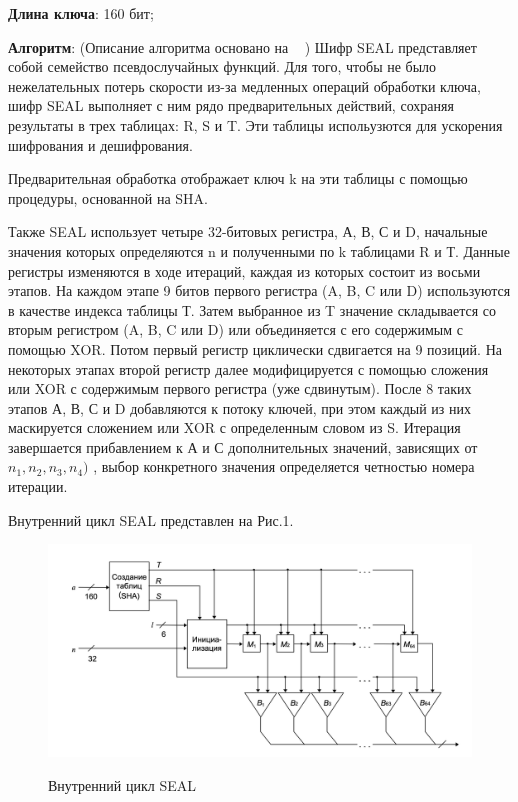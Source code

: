\documentclass[colorthm]{../civarticle}
\begin{document}
\textbf{Длина ключа}: 160 бит;

\textbf{Алгоритм}: (Описание алгоритма основано на ~\cite{SHnaier} ) Шифр SEAL представляет собой семейство псевдослучайных функций. Для того, чтобы не было нежелательных потерь скорости из-за медленных операций обработки ключа, шифр SEAL выполняет с ним рядо предварительных действий, сохраняя результаты в трех таблицах: R, S и T. Эти таблицы испольузются для ускорения шифрования и дешифрования. 

Предварительная обработка отображает ключ k на эти таблицы с помощью процедуры, основанной на SHA.

Также SEAL использует четыре 32-битовых регистра, А, В, С и D, начальные значения которых определяются n и полученными по k таблицами R и Т. Данные регистры изменяются в ходе итераций, каждая из которых состоит из восьми этапов. На каждом этапе 9 битов первого регистра (A, B, C или D) используются в качестве индекса таблицы Т. Затем выбранное из T значение складывается со вторым регистром (A, B, C или D) или объединяется с его содержимым с помощью XOR. Потом первый регистр циклически сдвигается на 9 позиций. На некоторых этапах второй регистр далее модифицируется с помощью сложения или XOR с содержимым первого регистра (уже сдвинутым). После 8 таких этапов А, В, С и D добавляются к потоку ключей, при этом каждый из них маскируется сложением или XOR с определенным словом из S. Итерация завершается прибавлением к А и С дополнительных значений, зависящих от $n_1, n_2, n_3, n_4)$ , выбор конкретного значения определяется четностью номера итерации.

Внутренний цикл SEAL представлен на Рис.1.

\begin{figure}[h]
{
\includegraphics[width=0.99\linewidth]{example/SEAL.png} } 

\caption{Внутренний цикл SEAL}
\end{figure}
\end{document}
